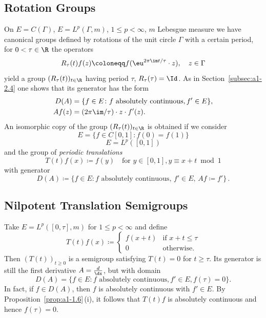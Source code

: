 \subsection{Rotation Groups}\label{subsec:a1-2.5}%
On $E = C(\Gamma)$, \resp $E = L^{p}(\Gamma,m)$, $1 \leq p < \infty$, $m$ Lebesgue measure we have canonical groups defined by rotations of the unit circle $\Gamma$ with a certain period, \ie for $0 < \tau \in \R$ the operators
\[
    R_{\tau}(t)f(z) \coloneqq f( \eu^{2\pi \im t/\tau}\cdot z), \quad z \in \Gamma
\]
yield a group $(R_{\tau}(t))_{t \in \R}$ having period $\tau$, \ie $R_{\tau}(\tau) = \Id$.
As in Section~\ref{subsec:a1-2.4} one shows that its generator has the form
\begin{align*}
    D(A) &= \{f \in E \colon f \text{ absolutely continuous}, f' \in E\}, \\
    Af(z)&= (2\pi \im/\tau) \cdot z \cdot f'(z).
\end{align*}
An isomorphic copy of the group $(R_{\tau}(t))_{t \in \R}$ is obtained if we consider 
\[
E = \{f \in C\left[ 0,1 \right] \colon f(0) = f(1)\}
\]
\resp 
\[
E = L^{p}(\left[ 0,1 \right])
\]
and the group of \emph{periodic translations}
\[
    T(t)f(x) \coloneqq f(y) \quad \text{for $y \in \left[ 0,1 \right], y \equiv x+t \bmod 1$} 
\]
with generator
\[
    D(A) \coloneqq \{f \in E \colon f \text{ absolutely continuous, $f' \in E$, $Af \coloneqq f'$} \}\,.
\]
\subsection{Nilpotent Translation Semigroups}\label{subsec:a1-2.6}%
Take $E = L^{p}([0,\tau],m)$ for $1 \leq p < \infty$ and define
\[
    T(t)f(x) \coloneqq \begin{cases}
        f(x+t) & \text{if } x+t \leq \tau \\
        0 & \text{otherwise.}
    \end{cases}
\]
Then $(T(t))_{t\geq 0}$ is a semigroup satisfying $T(t) = 0$ for $t \geq \tau$.
Its generator is still the first derivative $A = \frac{d}{\dx}$, but with domain 
\[
D(A) = \{f \in E \colon f \text{ absolutely continuous}, f' \in E, f(\tau) = 0\}.
\]
In fact, if\/ $f \in D(A)$, then $f$ is absolutely continuous with $f' \in E$.
By Proposition~\ref{prop:a1-1.6}\,(i), it follows that $T(t)f$ is absolutely continuous and hence $f(\tau) = 0$.
